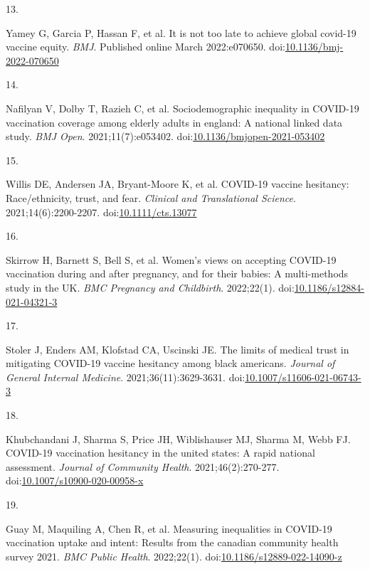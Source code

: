 \documentclass[
]{article}
\newlength{\cslhangindent}
\newlength{\csllabelwidth}
\newlength{\cslentryspacingunit} %
\newenvironment{CSLReferences}[2] %
 {%
  \setlength{\parindent}{0pt}
  \ifodd #1
  \let\oldpar\par
  \def\par{\hangindent=\cslhangindent\oldpar}
  \fi
  \setlength{\parskip}{#2\cslentryspacingunit}
 }%
 {}
\newcommand{\CSLLeftMargin}[1]{\parbox[t]{\csllabelwidth}{#1}}
\newcommand{\CSLRightInline}[1]{\parbox[t]{\linewidth - \csllabelwidth}{#1}\break}
\begin{document}
\begin{CSLReferences}{0}{0}
\leavevmode{}%
\CSLLeftMargin{13. }%
\CSLRightInline{Yamey G, Garcia P, Hassan F, et al. It is not too late
to achieve global covid-19 vaccine equity. \emph{{BMJ}}. Published
online March 2022:e070650.
doi:\href{https://doi.org/10.1136/bmj-2022-070650}{10.1136/bmj-2022-070650}}

\leavevmode{}%
\CSLLeftMargin{14. }%
\CSLRightInline{Nafilyan V, Dolby T, Razieh C, et al. Sociodemographic
inequality in {COVID}-19 vaccination coverage among elderly adults in
england: A national linked data study. \emph{{BMJ} Open}.
2021;11(7):e053402.
doi:\href{https://doi.org/10.1136/bmjopen-2021-053402}{10.1136/bmjopen-2021-053402}}

\leavevmode{}%
\CSLLeftMargin{15. }%
\CSLRightInline{Willis DE, Andersen JA, Bryant-Moore K, et al.
{COVID}-19 vaccine hesitancy: Race/ethnicity, trust, and fear.
\emph{Clinical and Translational Science}. 2021;14(6):2200-2207.
doi:\href{https://doi.org/10.1111/cts.13077}{10.1111/cts.13077}}

\leavevmode{}%
\CSLLeftMargin{16. }%
\CSLRightInline{Skirrow H, Barnett S, Bell S, et al. Women's views on
accepting {COVID}-19 vaccination during and after pregnancy, and for
their babies: A multi-methods study in the {UK}. \emph{{BMC} Pregnancy
and Childbirth}. 2022;22(1).
doi:\href{https://doi.org/10.1186/s12884-021-04321-3}{10.1186/s12884-021-04321-3}}

\leavevmode{}%
\CSLLeftMargin{17. }%
\CSLRightInline{Stoler J, Enders AM, Klofstad CA, Uscinski JE. The
limits of medical trust in mitigating {COVID}-19 vaccine hesitancy among
black americans. \emph{Journal of General Internal Medicine}.
2021;36(11):3629-3631.
doi:\href{https://doi.org/10.1007/s11606-021-06743-3}{10.1007/s11606-021-06743-3}}

\leavevmode{}%
\CSLLeftMargin{18. }%
\CSLRightInline{Khubchandani J, Sharma S, Price JH, Wiblishauser MJ,
Sharma M, Webb FJ. {COVID}-19 vaccination hesitancy in the united
states: A rapid national assessment. \emph{Journal of Community Health}.
2021;46(2):270-277.
doi:\href{https://doi.org/10.1007/s10900-020-00958-x}{10.1007/s10900-020-00958-x}}

\leavevmode{}%
\CSLLeftMargin{19. }%
\CSLRightInline{Guay M, Maquiling A, Chen R, et al. Measuring
inequalities in {COVID}-19 vaccination uptake and intent: Results from
the canadian community health survey 2021. \emph{{BMC} Public Health}.
2022;22(1).
doi:\href{https://doi.org/10.1186/s12889-022-14090-z}{10.1186/s12889-022-14090-z}}


\end{CSLReferences}
\end{document}
